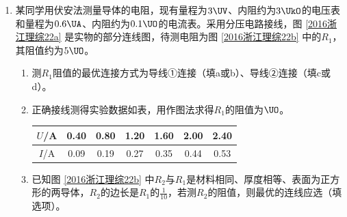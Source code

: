 \documentclass[\gkver]{gaokaozhenti}
\begin{document}
\begin{enumerate}
\begin{enumerate}
\end{enumerate}

\item
某同学用伏安法测量导体的电阻，现有量程为$3\UV$、内阻约为$3\UkO$的电压表和量程为$0.6\UA$、内阻约为$0.1\UO$的电流表。采用分压电路接线，图 \ref{2016浙江理综22a} 是实物的部分连线图，待测电阻为图 \ref{2016浙江理综22b} 中的$R_{1}$，其阻值约为$5\UO$。
\begin{enumerate}
	\item
	测$R_{1}$阻值的最优连接方式为导线①连接（填a或b）、导线②连接（填c或d）。

	\item
	正确接线测得实验数据如表，用作图法求得$R_{1}$的阻值为$\UO$。

	\begin{center}
	\begin{tabular}{|c|c|c|c|c|c|c|}
	\hline
	$U$/A & 0.40 & 0.80 & 1.20 & 1.60 & 2.00 & 2.40 \\
	\hline
	$I$/A & 0.09 & 0.19 & 0.27 & 0.35 & 0.44 & 0.53 \\
	\hline
	\end{tabular}
	\end{center}

	\item
	已知图 \ref{2016浙江理综22b} 中$R_{2}$与$R_{1}$是材料相同、厚度相等、表面为正方形的两导体，$R_{2}$的边长是$R_{1}$的$\frac{1}{10}$，若测$R_{2}$的阻值，则最优的连线应选（填选项）。


\end{enumerate}
\end{enumerate}
\end{document}
